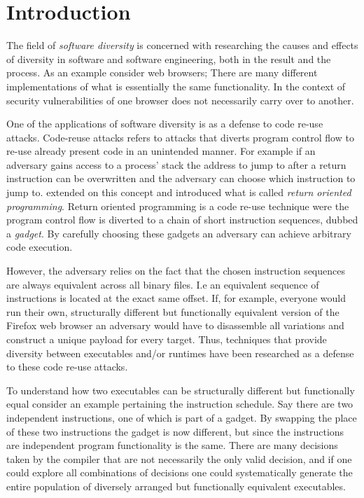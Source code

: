 \chapter{Introduction}

The field of \textit{software diversity} is concerned with researching the
causes and effects of diversity in software and software engineering, both in the result
and the process. As an example consider web browsers; There are many different implementations
of what is essentially the same functionality. In the context of security vulnerabilities
of one browser does not necessarily carry over to another\cite{survey}.

One of the applications of software diversity is as a defense to code re-use attacks\cite{survey}.
Code-reuse attacks refers to attacks that diverts program control flow to re-use already
present code in an unintended manner\cite{code-re-use}. For example if an adversary gains
access to a process' stack the address to jump to after a return instruction can be
overwritten and the adversary can choose which instruction to jump to. \textcite{rop}
extended on this concept and introduced what is called \textit{return oriented programming}.
Return oriented programming is a code re-use technique were the program control flow is
diverted to a chain of short instruction sequences, dubbed a \textit{gadget}. By carefully
choosing these gadgets an adversary can achieve arbitrary code execution.

However, the adversary relies on the fact that the chosen instruction sequences are always
equivalent across all binary files. I.e an equivalent sequence of instructions is located
at the exact same offset. If, for example, everyone would run their own, structurally
different but functionally equivalent version of the Firefox web browser an adversary would
have to disassemble all variations and construct a unique payload for every target. Thus,
techniques that provide diversity between executables and/or runtimes have been researched
as a defense to these code re-use attacks\cite{survey}.

To understand how two executables can be structurally different but functionally equal
consider an example pertaining the instruction schedule. Say there are two independent
instructions, one of which is part of a gadget. By swapping the place of these two
instructions the gadget is now different, but since the instructions are independent
program functionality is the same. There are many decisions taken by the compiler that are
not necessarily the only valid decision, and if one could explore all combinations of
decisions one could systematically generate the entire population of diversely arranged
but functionally equivalent executables.

